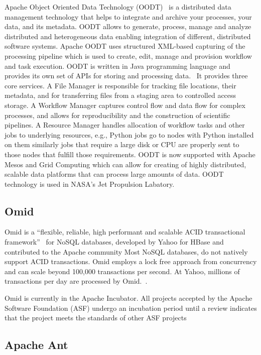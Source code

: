 Apache Object Oriented Data Technology (OODT)~\cite{www-oodt} is a
distributed data management technology that helps to integrate and
archive your processes, your data, and its metadata. OODT allows to
generate, process, manage and analyze distributed and heterogeneous
data enabling integration of different, distributed software
systems. Apache OODT uses structured XML-based capturing of the
processing pipeline which is used to create, edit, manage and
provision workflow and task execution. OODT is written in Java
programming language and provides its own set of APIs for storing and
processing data.~\cite{www-oodt-documentation} It provides three core
services. A File Manager is responsible for tracking file locations,
their metadata, and for transferring files from a staging area to
controlled access storage. A Workflow Manager captures control flow
and data flow for complex processes, and allows for reproducibility
and the construction of scientific pipelines. A Resource Manager
handles allocation of workflow tasks and other jobs to underlying
resources, e.g., Python jobs go to nodes with Python installed on them
similarly jobs that require a large disk or CPU are properly sent to
those nodes that fulfill those requirements. OODT is now supported
with Apache Mesos and Grid Computing which can allow for creating of
highly distributed, scalable data platforms that can process large
amounts of data. OODT technology is used in NASA's Jet Propulsion
Labatory.

\subsection{Omid \cv}

Omid is a ``flexible, reliable, high performant and scalable ACID
transactional framework''~\cite{www-apacheomid} for NoSQL databases,
developed by Yahoo for HBase and contributed to the Apache community
Most NoSQL databases, do not natively support ACID transactions. Omid
employs a lock free approach from concurrency and can scale beyond
100,000 transactions per second. At Yahoo, millions of transactions
per day are processed by Omid.~\cite{www-yahooomid}.

Omid is currently in the Apache Incubator.  All projects accepted by
the Apache Software Foundation (ASF) undergo an incubation period
until a review indicates that the project meets the standards of other
ASF projects~\cite{www-apacheincubator}


\subsection{Apache Ant}

